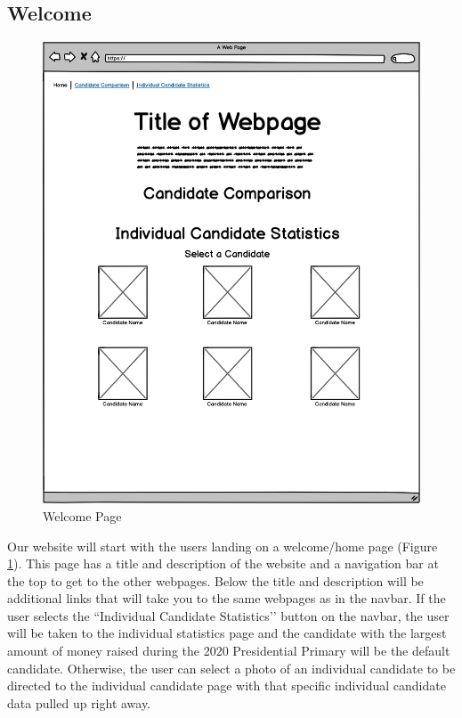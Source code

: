 \documentclass[12pt]{article}
\begin{document}
    \subsection{Welcome}
    \begin{figure}[H]
        \begin{center}
        \includegraphics[scale=.30]{welcome}
        \caption{Welcome Page}
        \label{fig:1}
        \end{center}
    \end{figure}
    Our website will start with the users landing on a welcome/home page (Figure \ref{fig:1}). This page has a title and description of the website and a navigation bar at the top to get to the other webpages. Below the title and description will be additional links that will take you to the same webpages as in the navbar. If the user selects the ``Individual Candidate Statistics’’ button on the navbar, the user will be taken to the individual statistics page and the candidate with the largest amount of money raised during the 2020 Presidential Primary will be the default candidate. Otherwise, the user can select a photo of an individual candidate to be directed to the individual candidate page with that specific individual candidate data pulled up right away.
\end{document}
